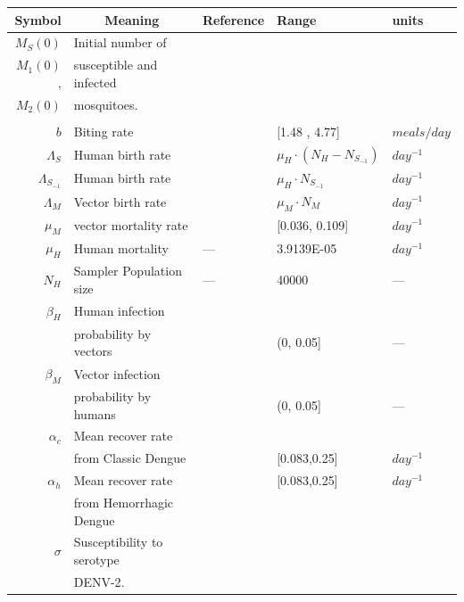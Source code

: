 \begin{table}[htb]
	\begin{center}
		\begin{tabular}{rllll}
			\toprule
			Symbol		&	\multicolumn{1}{c}{Meaning} &
				Reference	& Range & units
		\\
		\midrule
			$M_S(0)$
				& Initial number of 
		\\
			$M_1(0)$,
				& susceptible and infected
		\\
		    $M_2(0)$
		    &  mosquitoes.
		\\
		\\
			$b$
			& Biting rate
			&\cite{YasunoM1990}
			&[1.48 , 4.77] & $\si{meals \per day}$ 
		\\
			$\Lambda_S$
				& Human birth rate
				&
				& 
					$\mu_H \cdot (N_H - N_{S_{-1}})$
				& $\si{day^{-1}}$
		\\
			$\Lambda_{S_{-1}}$
				& Human birth rate
				&
				& 
					$\mu_H \cdot N_{S_{-1}}$
				& $\si{day^{-1}}$
		\\
			$\Lambda_M$
			& Vector birth rate
			&
			& $\mu_M \cdot N_M$
			& $\si{day^{-1}}$
		\\
			$\mu_M$
			& vector mortality rate
			& \cite{YANG2009}
      & [\num{0.036}, \num{0.109}] 
      & $\si{day^{-1}}$
    \\
			$\mu_H$
			& Human mortality
			&---
			& \num{3.9139E-05} 
			& $\si{day^{-1}}$
		\\
			$N_H$   
			& Sampler Population size  
			&---
			&\num{40000}
			&---	
		\\
			$\beta_H$ 
			&	Human infection 
			\\
      & probability  by vectors
			& \cite{Feng1997a} 
			& (\num{0}, \num{0.05}] 
			& ---
		\\
			$\beta_M$
			& Vector infection 
			\\
      & probability by humans
			& \cite{Feng1997a}& (\num{0}, \num{0.05}] & ---
		\\
			$\alpha_{c}$ 
			& Mean recover rate 
			\\
      & from Classic Dengue
			&\cite{Pinho2010}
			& [\num{0.083},\num{0.25}] & $\si{day^{-1}}$
		\\
			$\alpha_{h}$	& Mean recover rate
			& \cite{Pinho2010} 
			& [\num{0.083},\num{0.25}] 
			& $\si{day^{-1}}$
		\\
			& from Hemorrhagic Dengue
		\\
			$\sigma$
			& Susceptibility to serotype 
		\\
			& \ac{DENV-2}.

\end{tabular}
\end{center}
\end{table}
